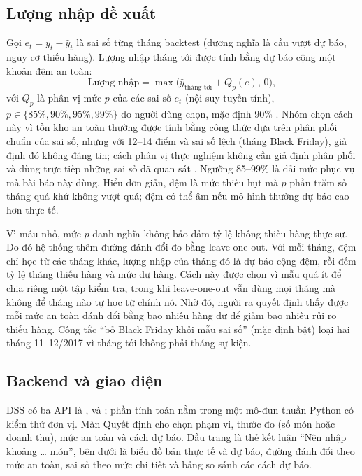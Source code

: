 \subsection{Lượng nhập đề xuất}
Gọi $e_t=y_t-\hat y_t$ là sai số từng tháng backtest (dương nghĩa là cầu vượt dự báo, nguy cơ thiếu hàng). Lượng nhập tháng tới được tính bằng dự báo cộng một khoản đệm an toàn:
\begin{equation}
\text{Lượng nhập}=\max\bigl(\hat y_{\text{tháng tới}}+Q_{p}(e),\,0\bigr),
\end{equation}
với $Q_p$ là phân vị mức $p$ của các sai số $e_t$ (nội suy tuyến tính), $p\in\{85\%,90\%,95\%,99\%\}$ do người dùng chọn, mặc định 90\% \cite{trapero}. Nhóm chọn cách này vì tồn kho an toàn thường được tính bằng công thức dựa trên phân phối chuẩn của sai số, nhưng với 12--14 điểm và sai số lệch (tháng Black Friday), giả định đó không đáng tin; cách phân vị thực nghiệm không cần giả định phân phối và dùng trực tiếp những sai số đã quan sát \cite{trapero}. Ngưỡng 85--99\% là dải mức phục vụ mà bài báo này dùng. Hiểu đơn giản, đệm là mức thiếu hụt mà $p$ phần trăm số tháng quá khứ không vượt quá; đệm có thể âm nếu mô hình thường dự báo cao hơn thực tế.

Vì mẫu nhỏ, mức $p$ danh nghĩa không bảo đảm tỷ lệ không thiếu hàng thực sự. Do đó hệ thống thêm đường đánh đổi đo bằng leave-one-out. Với mỗi tháng, đệm chỉ học từ các tháng khác, lượng nhập của tháng đó là dự báo cộng đệm, rồi đếm tỷ lệ tháng thiếu hàng và mức dư hàng. Cách này được chọn vì mẫu quá ít để chia riêng một tập kiểm tra, trong khi leave-one-out vẫn dùng mọi tháng mà không để tháng nào tự học từ chính nó. Nhờ đó, người ra quyết định thấy được mỗi mức an toàn đánh đổi bằng bao nhiêu hàng dư để giảm bao nhiêu rủi ro thiếu hàng. Công tắc ``bỏ Black Friday khỏi mẫu sai số'' (mặc định bật) loại hai tháng 11--12/2017 vì tháng tới không phải tháng sự kiện.

\subsection{Backend và giao diện}
DSS có ba API là ,  và ; phần tính toán nằm trong một mô-đun thuần Python có kiểm thử đơn vị. Màn Quyết định cho chọn phạm vi, thước đo (số món hoặc doanh thu), mức an toàn và cách dự báo. Đầu trang là thẻ kết luận ``Nên nhập khoảng \ldots{} món'', bên dưới là biểu đồ bán thực tế và dự báo, đường đánh đổi theo mức an toàn, sai số theo mức chi tiết và bảng so sánh các cách dự báo.

